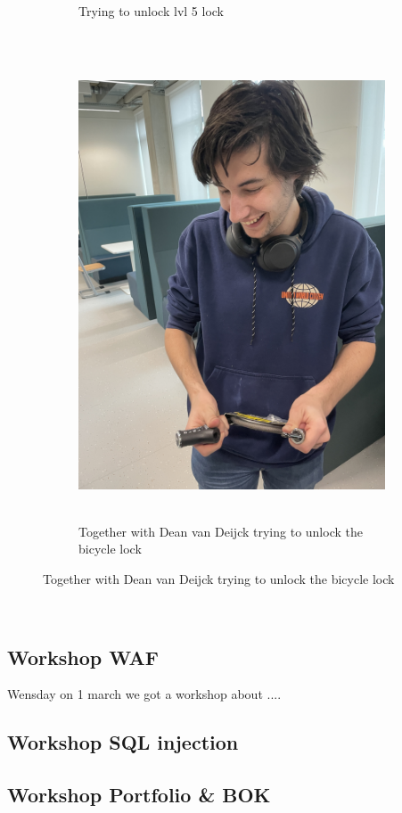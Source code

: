 \documentclass[12pt, letterpaper]{article}
\begin{document}
\begin{figure}[!ht]
\begin{subfigure}{.5\textwidth}
        \caption{Trying to unlock lvl 5 lock}
    \end{subfigure}
    \begin{subfigure}{.5\textwidth}
    \centering
    \includegraphics[width=.8\linewidth]{PDFs/Week 2/Lockpicking with dean.jpeg}
    \caption{Together with Dean van Deijck trying to unlock the bicycle lock}
\end{subfigure}%
\end{figure}\mbox{}\\
\newpage
\subsection{Workshop WAF}
Wensday on 1 march we got a workshop about .... 

\subsection{Workshop SQL injection}

\newpage
\subsection{Workshop Portfolio \& BOK}
\end{document}
